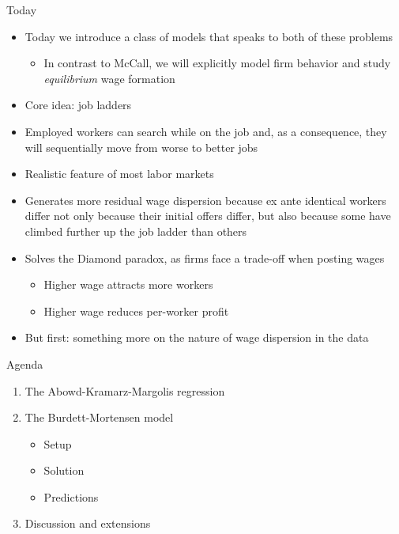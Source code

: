 \documentclass[9pt]{beamer}
\newcommand{\bit}{\begin{itemize}}
\newcommand{\eit}{\end{itemize}}
\newcommand{\ben}{\begin{enumerate}}
\newcommand{\een}{\end{enumerate}}
\newcommand{\bc}{\color{blue}}
\begin{document}
\begin{frame}{Today}

\bit
\setlength\itemsep{1.5em}

\item Today we introduce a class of models that speaks to both of these problems
\bit
	\item In contrast to McCall, we will explicitly model firm behavior and study \emph{equilibrium} wage formation
\eit

\item Core idea: {\bc job ladders}

\item Employed workers can search while on the job and, as a consequence, they will sequentially move from worse to better jobs

\item Realistic feature of most labor markets

\item Generates more residual wage dispersion because ex ante identical workers differ not only because their initial offers differ, but also because some have climbed further up the job ladder than others

\item Solves the Diamond paradox, as firms face a trade-off when posting wages
\bit
	\item Higher wage attracts more workers
	\item Higher wage reduces per-worker profit
\eit

\item But first: something more on the nature of wage dispersion in the data

\eit

\end{frame}


\begin{frame}{Agenda}

\ben
\setlength\itemsep{2em}

\item The Abowd-Kramarz-Margolis regression

\item The Burdett-Mortensen model
\bit
	\item Setup
	\item Solution
	\item Predictions
\eit

\item Discussion and extensions

\een

\end{frame}
\end{document}
